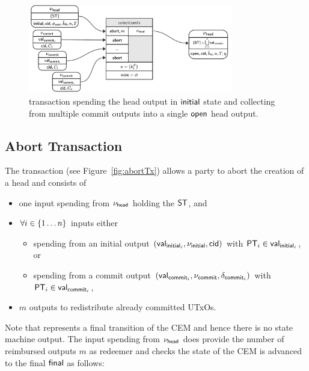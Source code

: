 \begin{figure}[h]
	\centering
	\includegraphics[width=0.8\textwidth]{figures/collectComTx.pdf}
	\caption{\mtxCCom{} transaction spending the head output in $\mathsf{initial}$
		state and collecting from multiple commit outputs into a single
		$\mathsf{open}$ head output.}\label{fig:collectComTx}
\end{figure}

\subsection{Abort Transaction}\label{sec:abort-tx}

\begin{samepage}
	The \mtxAbort{} transaction (see Figure~\ref{fig:abortTx}) allows a
	party to abort the creation of a head and consists of
	\begin{itemize}
		\item one input spending from $\nu_\mathsf{head}$ holding the $\mathsf{ST}$, and
		\item $\forall i \in \{1 \dots n\}$ inputs either
		      \begin{itemize}
			      \item spending from an initial output $(\mathsf{val}_{\mathsf{initial}_{i}}, \nu_{\mathsf{initial}}, \mathsf{cid})$ with $\mathsf{PT}_{i} \in \mathsf{val}_{\mathsf{initial}_{i}}$, or
			      \item spending from a commit output $(\mathsf{val}_{\mathsf{commit}_{i}}, \nu_{\mathsf{commit}}, \delta_{\mathsf{commit}_{i}})$ with $\mathsf{PT}_{i} \in \mathsf{val}_{\mathsf{commit}_{i}}$,
		      \end{itemize}
		\item $m$ outputs to redistribute already committed UTxOs.
	\end{itemize}
\end{samepage}

\noindent Note that \mtxAbort{} represents a final transition of the CEM and hence there
is no state machine output. The input spending from $\nu_\mathsf{head}$ does provide the
number of reimbursed outputs $m$ as redeemer  and checks the state of the CEM is
advanced to the final $\mathsf{final}$ as follows:

